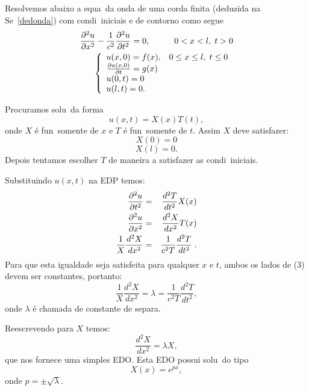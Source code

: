 Resolvemos abaixo a equa\cao\ da onda de uma corda finita (deduzida na
Se\cao\ \ref{dedonda}) com condi\coes\ iniciais e de contorno 
como segue
\begin{eqnarray*}
\frac{\partial^{2}u}{\partial x^{2}} - \frac{1}{c^{2}}\frac{\partial^{2}u}{\partial t^{2}} = 0,  \hspace{1cm} 0 < x < l, \; t > 0 \\
\left\{
\begin{array}{ll}
u(x,0) = f(x), & 0\leq x\leq l, \; t\leq 0 \\
\frac{\partial u(x,0)}{\partial t} = g(x) & \\
u(0,t) = 0 & \\
u(l,t) = 0. &
\end{array}
\right.
\end{eqnarray*}

Procuramos solu\coes\ da forma
\[u(x,t) = X(x)T(t),\]
onde $X$ \'e fun\cao\ somente de $x$ e $T$ \'e fun\cao\ somente de
$t$. Assim $X$ deve satisfazer:
\[X(0) = 0\]
\[X(l) = 0.\]
Depois tentamos escolher $T$ de maneira a satisfazer as
condi\coes\ iniciais.

Substituindo $u(x,t)$ na EDP temos:
\begin{eqnarray}
\frac{\partial^{2}u}{\partial t^{2}} & = & \frac{d^{2}T}{dt^{2}}X(x)\nonumber \\ 
\frac{\partial^{2}u}{\partial x^{2}} & = & \frac{d^{2}X}{dx^{2}}T(x)\nonumber \\ 
\frac{1}{X}\frac{d^{2}X}{dx^{2}} & = &
   \frac{1}{c^{2}T}\frac{d^{2}T}{dt^{2}} \; .
\end{eqnarray}
Para que esta igualdade seja satisfeita para qualquer $x$ e $t$, ambos
os lados de (3) devem ser constantes, portanto:
\[
\frac{1}{X}\frac{d^{2}X}{dx^{2}} = \lambda =
\frac{1}{c^{2}T}\frac{d^{2}T}{dt^{2}},
\]
onde $\lambda$ \'e chamada de constante de separa\cao.

Reescrevendo para $X$ temos:
\[
\frac{d^{2}X}{dx^{2}} = \lambda X,
\]
que nos fornece uma simples EDO. Esta EDO
possui solu\coes\ do tipo
\[
X(x) = e^{px},
\]
onde $p = \pm\sqrt{\lambda}$.

